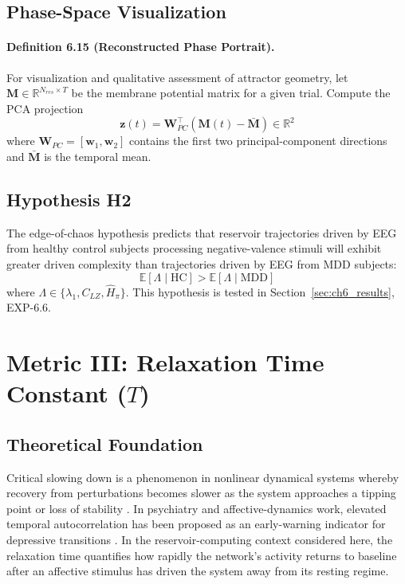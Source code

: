 \subsection{Phase-Space Visualization}

\paragraph{Definition 6.15 (Reconstructed Phase Portrait).}
For visualization and qualitative assessment of attractor geometry, let $\mathbf{M} \in \mathbb{R}^{N_{res}\times T}$ be the membrane potential matrix for a given trial. Compute the PCA projection
\begin{equation}
\mathbf{z}(t)=\mathbf{W}_{PC}^{\top}(\mathbf{M}(t)-\bar{\mathbf{M}}) \in \mathbb{R}^{2}
\end{equation}
where $\mathbf{W}_{PC}=[\mathbf{w}_1,\mathbf{w}_2]$ contains the first two principal-component directions and $\bar{\mathbf{M}}$ is the temporal mean.

\subsection{Hypothesis H2}
The edge-of-chaos hypothesis predicts that reservoir trajectories driven by EEG from healthy control subjects processing negative-valence stimuli will exhibit greater driven complexity than trajectories driven by EEG from MDD subjects:
\begin{equation}
\mathbb{E}[\Lambda\mid \mathrm{HC}] > \mathbb{E}[\Lambda\mid \mathrm{MDD}]
\end{equation}
where $\Lambda \in \{\lambda_1,C_{LZ},\hat{H}_{\pi}\}$. This hypothesis is tested in Section~\ref{sec:ch6_results}, EXP-6.6.

\section{Metric III: Relaxation Time Constant ($T$)}
\label{sec:dynamics_tau}

\subsection{Theoretical Foundation}

Critical slowing down is a phenomenon in nonlinear dynamical systems whereby recovery from perturbations becomes slower as the system approaches a tipping point or loss of stability \cite{scheffer_early-warning_2009}. In psychiatry and affective-dynamics work, elevated temporal autocorrelation has been proposed as an early-warning indicator for depressive transitions \cite{vandeleemput_critical_2014,wichers_critical_2016}. In the reservoir-computing context considered here, the relaxation time quantifies how rapidly the network's activity returns to baseline after an affective stimulus has driven the system away from its resting regime.

